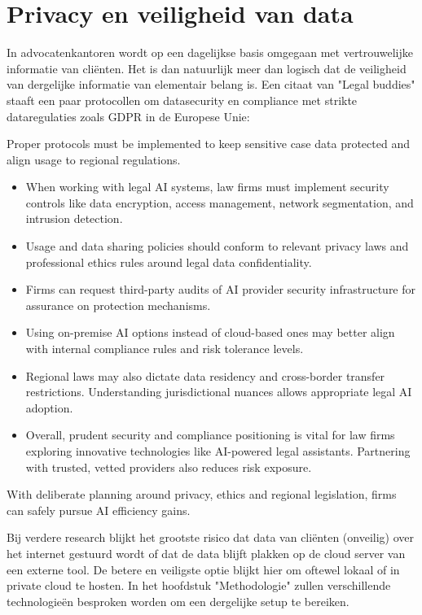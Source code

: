 \section{Privacy en veiligheid  van data}
In advocatenkantoren wordt op een dagelijkse basis omgegaan met vertrouwelijke informatie van cliënten. Het is dan natuurlijk meer dan logisch dat de veiligheid van dergelijke informatie van
elementair belang is. Een citaat van "Legal buddies" staaft een paar protocollen om datasecurity en compliance met strikte dataregulaties zoals GDPR in de Europese Unie:

\begin{displayquote}
	Proper protocols must be implemented to keep sensitive case data protected and align usage to regional regulations.
	\begin{itemize}
		\item When working with legal AI systems, law firms must implement security controls like data encryption, access management, network segmentation, and intrusion detection. 
		\item Usage and data sharing policies should conform to relevant privacy laws and professional ethics rules around legal data confidentiality. 
		\item Firms can request third-party audits of AI provider security infrastructure for assurance on protection mechanisms. 
		\item Using on-premise AI options instead of cloud-based ones may better align with internal compliance rules and risk tolerance levels. 
		\item Regional laws may also dictate data residency and cross-border transfer restrictions. Understanding jurisdictional nuances allows appropriate legal AI adoption. 
		\item Overall, prudent security and compliance positioning is vital for law firms exploring innovative technologies like AI-powered legal assistants. Partnering with trusted, vetted providers also reduces risk exposure. 
	\end{itemize}

	With deliberate planning around privacy, ethics and regional legislation, firms can safely pursue AI efficiency gains.\autocite{LegalBuddies}
\end{displayquote}

Bij verdere research blijkt het grootste risico dat data van cliënten (onveilig) over het internet gestuurd wordt of dat de data blijft plakken op de cloud server van een externe tool. 
De betere en veiligste optie blijkt hier om oftewel lokaal of in private cloud te hosten. In het hoofdstuk "Methodologie" zullen verschillende technologieën besproken worden om een dergelijke
setup te bereiken. 


